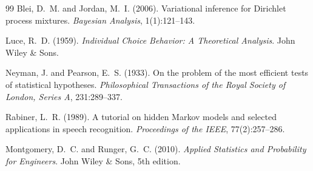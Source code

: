 \documentclass[11pt,a4paper]{article}
\begin{document}
\begin{thebibliography}{99}
Blei, D.~M. and Jordan, M.~I. (2006).
\newblock Variational inference for {D}irichlet process mixtures.
\newblock \emph{Bayesian Analysis}, 1(1):121--143.

Luce, R.~D. (1959).
\newblock \emph{Individual Choice Behavior: A Theoretical Analysis}.
\newblock John Wiley \& Sons.

Neyman, J. and Pearson, E.~S. (1933).
\newblock On the problem of the most efficient tests of statistical hypotheses.
\newblock \emph{Philosophical Transactions of the Royal Society of London,
Series A}, 231:289--337.

Rabiner, L.~R. (1989).
\newblock A tutorial on hidden {M}arkov models and selected applications in
speech recognition.
\newblock \emph{Proceedings of the IEEE}, 77(2):257--286.

Montgomery, D.~C. and Runger, G.~C. (2010).
\newblock \emph{Applied Statistics and Probability for Engineers}.
\newblock John Wiley \& Sons, 5th edition.

\end{thebibliography}
\end{document}
